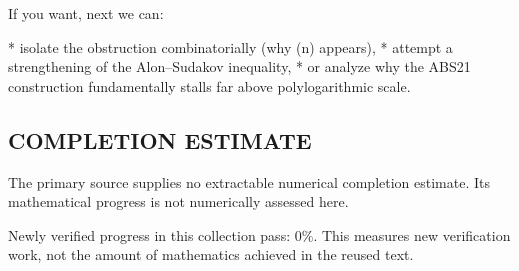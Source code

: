 If you want, next we can:

* isolate the obstruction combinatorially (why (\log\log n) appears),
* attempt a strengthening of the Alon–Sudakov inequality,
* or analyze why the ABS21 construction fundamentally stalls far above polylogarithmic scale.


\subsection*{COMPLETION ESTIMATE}
The primary source supplies no extractable numerical completion estimate. Its mathematical progress is not numerically assessed here.

Newly verified progress in this collection pass: $0\%$. This measures new verification work, not the amount of mathematics achieved in the reused text.
